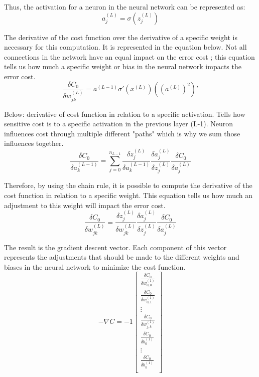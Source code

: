 \documentclass[12pt,a4paper,notitlepage]{article}
\begin{document}
Thus, the activation for a neuron in the neural network can be represented as:
\begin{displaymath}
	a_j^{(L)} = \sigma\left(z_j^{(L)}\right)
\end{displaymath}

The derivative of the cost function over the derivative of a specific weight is necessary for this computation. It is represented in the equation below. Not all connections in the network have an equal impact on the error cost ; this equation tells us how much a specific weight or bias in the neural network impacts the error cost.
\begin{displaymath}
	\frac{\delta C_0}{\delta w_{jk}^{(L)}} = a^{(L-1)} \sigma\prime(x^{(L)})((a^{(L)})^2)\prime
\end{displaymath}

Below: derivative of cost function in relation to a specific activation. Tells how sensitive cost is to a specific activation in the previous layer (L-1). Neuron influences cost through multiple different "paths" which is why we sum those influences together.
\begin{displaymath}
	\frac{\delta C_0}{\delta a_{k}^{(L-1)}} = 
	\sum_{j=0}^{n_{L-1}}
	\frac{\delta z_j^{(L)}}{\delta a_{k}^{(L-1)}}
	\frac{\delta a_j^{(L)}}{\delta z_j^{(L)}}
	\frac{\delta C_0}{\delta a_j^{(L)}}
\end{displaymath}

Therefore, by using the chain rule, it is possible to compute the derivative of the cost function in relation to a specific weight. This equation tells us how much an adjustment to this weight will impact the error cost.
\begin{displaymath}
	\frac{\delta C_0}{\delta w_{jk}^{(L)}} = 
	\frac{\delta z_j^{(L)}}{\delta w_{jk}^{(L)}}
	\frac{\delta a_j^{(L)}}{\delta z_j^{(L)}}
	\frac{\delta C_0}{\delta a_j^{(L)}}
\end{displaymath}

The result is the gradient descent vector. Each component of this vector represents the adjustments that should be made to the different weights and biases in the neural network to minimize the cost function.
\begin{displaymath}
	-\nabla C =
	-1 \begin{bmatrix}
		\frac{\delta C_0}{\delta w_{0,0}^{(1)}}\\
		\frac{\delta C_0}{\delta w_{0,1}^{(1)}}\\
		\vdots\\
		\frac{\delta C_0}{\delta w_{j,k}^{(1)}}\\
		\frac{\delta C_0}{\delta b_{0}^{(1)}}\\
		\vdots\\
		\frac{\delta C_0}{\delta b_{k}^{(1)}}\\
	\end{bmatrix}
\end{displaymath}
\end{document}
